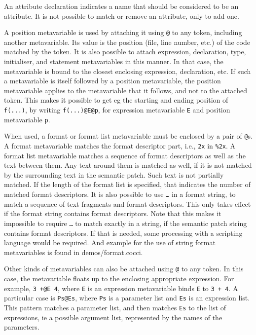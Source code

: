 An attribute declaration indicates a name that should be considered to be
an attribute.  It is not possible to match or remove an attribute, only to
add one.

A position metavariable is used by attaching it using \texttt{@} to any
token, including another metavariable.  Its value is the position (file,
line number, etc.) of the code matched by the token.  It is also possible
to attach expression, declaration, type, initialiser, and statement
metavariables in this manner.  In that case, the metavariable is bound to
the closest enclosing expression, declaration, etc.  If such a metavariable
is itself followed by a position metavariable, the position metavariable
applies to the metavariable that it follows, and not to the attached token.
This makes it possible to get eg the starting and ending position of {\tt
  f(...)}, by writing {\tt f(...)@E@p}, for expression metavariable {\tt E}
and position metavariable {\tt p}.

When used, a format or format list metavariable must be enclosed by a pair
of \texttt{@}s.  A format metavariable matches the format descriptor part,
i.e., \texttt{2x} in \texttt{\%2x}.  A format list metavariable matches a
sequence of format descriptors as well as the text between them.  Any text
around them is matched as well, if it is not matched by the surrounding
text in the semantic patch.  Such text is not partially matched.  If the
length of the format list is specified, that indicates the number of
matched format descriptors.  It is also possible to use \texttt{\ldots} in
a format string, to match a sequence of text fragments and format
descriptors.  This only takes effect if the format string contains format
descriptors.  Note that this makes it impossible to require \texttt{\ldots}
to match exactly in a string, if the semantic patch string contains format
descriptors.  If that is needed, some processing with a scripting language
would be required.  And example for the use of string format metavariables
is found in demos/format.cocci.

Other kinds of metavariables can also be attached using \texttt{@} to any
token.  In this case, the metavariable floats up to the enclosing
appropriate expression.  For example, {\tt 3 +@E 4}, where {\tt E} is an
expression metavariable binds {\tt E} to {\tt 3 + 4}.  A particular case is
{\tt Ps@Es}, where {\tt Ps} is a parameter list and {\tt Es} is an
expression list.  This pattern matches a parameter list, and then matches
{\tt Es} to the list of expressions, ie a possible argument list,
represented by the names of the parameters.

